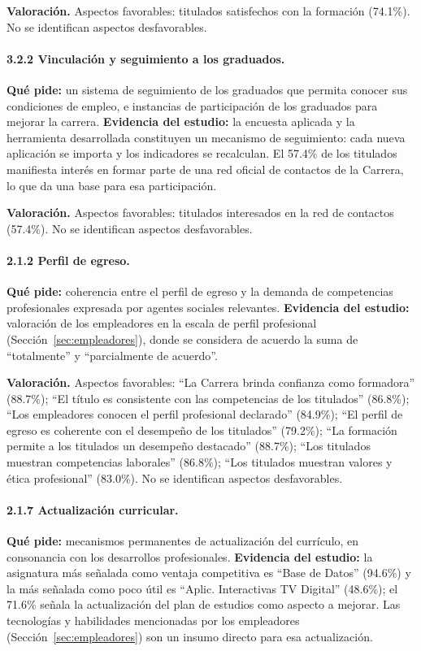 \textbf{Valoración.} Aspectos favorables: titulados satisfechos con la formación (74.1\%). No se identifican aspectos desfavorables.

\paragraph{3.2.2 Vinculación y seguimiento a los graduados.} \textbf{Qué pide:} un sistema de seguimiento de los graduados que permita conocer sus condiciones de empleo, e instancias de participación de los graduados para mejorar la carrera. \textbf{Evidencia del estudio:} la encuesta aplicada y la herramienta desarrollada constituyen un mecanismo de seguimiento: cada nueva aplicación se importa y los indicadores se recalculan. El 57.4\% de los titulados manifiesta interés en formar parte de una red oficial de contactos de la Carrera, lo que da una base para esa participación.

\textbf{Valoración.} Aspectos favorables: titulados interesados en la red de contactos (57.4\%). No se identifican aspectos desfavorables.

\paragraph{2.1.2 Perfil de egreso.} \textbf{Qué pide:} coherencia entre el perfil de egreso y la demanda de competencias profesionales expresada por agentes sociales relevantes. \textbf{Evidencia del estudio:} valoración de los empleadores en la escala de perfil profesional (Sección~\ref{sec:empleadores}), donde se considera de acuerdo la suma de ``totalmente'' y ``parcialmente de acuerdo''.

\textbf{Valoración.} Aspectos favorables: ``La Carrera brinda confianza como formadora'' (88.7\%); ``El título es consistente con las competencias de los titulados'' (86.8\%); ``Los empleadores conocen el perfil profesional declarado'' (84.9\%); ``El perfil de egreso es coherente con el desempeño de los titulados'' (79.2\%); ``La formación permite a los titulados un desempeño destacado'' (88.7\%); ``Los titulados muestran competencias laborales'' (86.8\%); ``Los titulados muestran valores y ética profesional'' (83.0\%). No se identifican aspectos desfavorables.

\paragraph{2.1.7 Actualización curricular.} \textbf{Qué pide:} mecanismos permanentes de actualización del currículo, en consonancia con los desarrollos profesionales. \textbf{Evidencia del estudio:} la asignatura más señalada como ventaja competitiva es ``Base de Datos'' (94.6\%) y la más señalada como poco útil es ``Aplic. Interactivas TV Digital'' (48.6\%); el 71.6\% señala la actualización del plan de estudios como aspecto a mejorar. Las tecnologías y habilidades mencionadas por los empleadores (Sección~\ref{sec:empleadores}) son un insumo directo para esa actualización.

